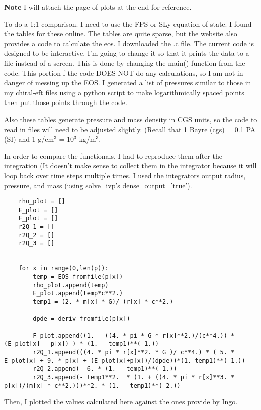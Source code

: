 \documentclass[11pt]{article}
\numberwithin{equation}{section}
\begin{document}
\textbf{Note} I will attach the page of plots at the end for reference.  


To do a 1:1 comparison. I need to use the FPS or SLy equation of state.  I found the tables for these online.  The tables are quite sparse, but the website also provides a code to calculate the eos.  I downloaded the .c file.  The current code is designed to be interactive.  I'm going to change it so that it prints the data to a file instead of a screen.  This is done by changing the main() function from the code.  This portion f the code DOES NOT do any calculations, so I am not in danger of messing up the EOS.  I generated a list of pressures similar to those in my chiral-eft files using a python script to make logarithmically spaced points then put those points through the code.  

Also these tables generate pressure and mass density in CGS units, so the code to read in files will need to be adjusted slightly.  (Recall that 1 Bayre (cgs) = 0.1 PA (SI) and 1 g/cm$^3$ = 10$^3$ kg/m$^3$.  

In order to compare the functionals, I had to reproduce them after the integration (It doesn't make sense to collect them in the integrator because it will loop back over time steps multiple times.   I used the integrators output radius, pressure, and mass (using solve\_ivp's dense\_output='true').

\begin{lstlisting}
    rho_plot = []
    E_plot = []
    F_plot = []
    r2Q_1 = []
    r2Q_2 = []
    r2Q_3 = []


    for x in range(0,len(p)):
        temp = EOS_fromfile(p[x])
        rho_plot.append(temp)
        E_plot.append(temp*c**2.)
        temp1 = (2. * m[x] * G)/ (r[x] * c**2.)

        dpde = deriv_fromfile(p[x])

        F_plot.append((1. - ((4. * pi * G * r[x]**2.)/(c**4.)) * (E_plot[x] - p[x]) ) * (1. - temp1)**(-1.))
        r2Q_1.append(((4. * pi * r[x]**2. * G )/ c**4.) * ( 5. * E_plot[x] + 9. * p[x] + (E_plot[x]+p[x])/(dpde))*(1.-temp1)**(-1.)) 
        r2Q_2.append(- 6. * (1. - temp1)**(-1.))
        r2Q_3.append(- temp1**2.  * (1. + ((4. * pi * r[x]**3. * p[x])/(m[x] * c**2.)))**2. * (1. - temp1)**(-2.))
\end{lstlisting}


Then, I plotted the values calculated here against the ones provide by Ingo.
\end{document}
